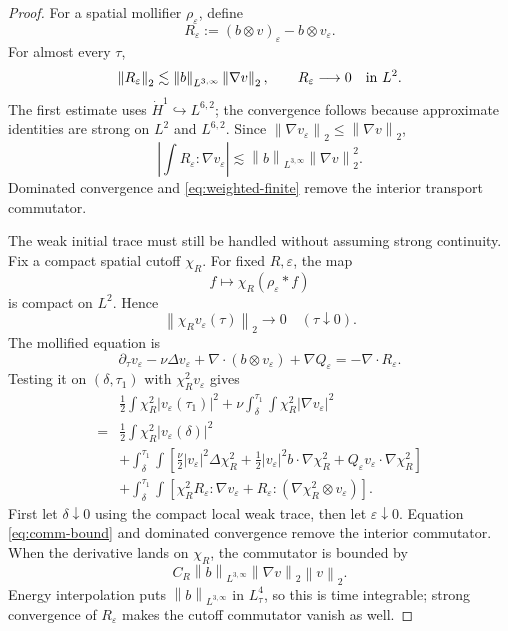 \documentclass[11pt]{article}
\theoremstyle{remark}
\newcommand{\norm}[1]{\left\|#1\right\|}
\begin{document}
\begin{proof}
For a spatial mollifier \(\rho_\varepsilon\), define
\[
 R_\varepsilon
 :=
 (b\otimes v)_\varepsilon-b\otimes v_\varepsilon.
\]
For almost every \(\tau\),
\begin{equation}
 \label{eq:comm-bound}
 \norm{R_\varepsilon}_2
 \lesssim
 \norm{b}_{L^{3,\infty}}\norm{\nabla v}_2,
 \qquad
 R_\varepsilon\longrightarrow0
 \quad\hbox{in }L^2.
\end{equation}
The first estimate uses
\(\dot H^1\hookrightarrow L^{6,2}\); the convergence follows because
approximate identities are strong on \(L^2\) and \(L^{6,2}\).
Since
\(\norm{\nabla v_\varepsilon}_2\leq\norm{\nabla v}_2\),
\[
 \left|\int R_\varepsilon:\nabla v_\varepsilon\right|
 \lesssim
 \norm{b}_{L^{3,\infty}}\norm{\nabla v}_2^2.
\]
Dominated convergence and \eqref{eq:weighted-finite} remove the
interior transport commutator.

The weak initial trace must still be handled without assuming strong
continuity.  Fix a compact spatial cutoff \(\chi_R\).  For fixed
\(R,\varepsilon\), the map
\[
 f\longmapsto\chi_R(\rho_\varepsilon*f)
\]
is compact on \(L^2\).  Hence
\[
 \norm{\chi_Rv_\varepsilon(\tau)}_2\longrightarrow0
 \quad(\tau\downarrow0).
\]
The mollified equation is
\[
 \partial_\tau v_\varepsilon-\nu\Delta v_\varepsilon
 +\nabla\cdot(b\otimes v_\varepsilon)+\nabla Q_\varepsilon
 =-\nabla\cdot R_\varepsilon.
\]
Testing it on \((\delta,\tau_1)\) with
\(\chi_R^2v_\varepsilon\) gives
\begin{align*}
&\frac12\int\chi_R^2|v_\varepsilon(\tau_1)|^2
 +\nu\int_\delta^{\tau_1}\int
       \chi_R^2|\nabla v_\varepsilon|^2\\
={}&\frac12\int\chi_R^2|v_\varepsilon(\delta)|^2\\
&+\int_\delta^{\tau_1}\int
 \left[
 \frac{\nu}{2}|v_\varepsilon|^2\Delta\chi_R^2
 +\frac12|v_\varepsilon|^2b\cdot\nabla\chi_R^2
 +Q_\varepsilon v_\varepsilon\cdot\nabla\chi_R^2
 \right]\\
&+\int_\delta^{\tau_1}\int
 \left[
 \chi_R^2R_\varepsilon:\nabla v_\varepsilon
 +R_\varepsilon:(\nabla\chi_R^2\otimes v_\varepsilon)
 \right].
\end{align*}
First let \(\delta\downarrow0\) using the compact local weak trace, then
let \(\varepsilon\downarrow0\).  Equation \eqref{eq:comm-bound} and
dominated convergence remove the interior commutator.
When the derivative lands on \(\chi_R\), the commutator is bounded by
\[
 C_R\norm{b}_{L^{3,\infty}}\norm{\nabla v}_2\norm{v}_2.
\]
Energy interpolation puts
\(\norm{b}_{L^{3,\infty}}\) in \(L^4_\tau\), so this is time
integrable; strong convergence of \(R_\varepsilon\) makes the cutoff
commutator vanish as well.


\end{proof}
\end{document}
